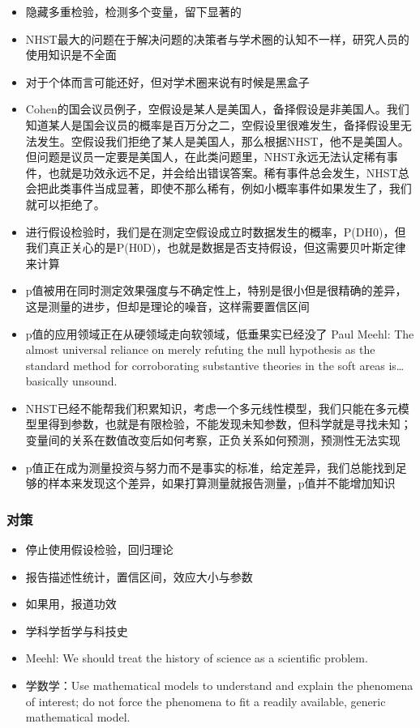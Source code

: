 \documentclass[]{book}
\providecommand{\tightlist}{%
  \setlength{\itemsep}{0pt}\setlength{\parskip}{0pt}}
\begin{document}
\begin{itemize}
\tightlist
\item
  隐藏多重检验，检测多个变量，留下显著的
\item
  NHST最大的问题在于解决问题的决策者与学术圈的认知不一样，研究人员的使用知识是不全面
\item
  对于个体而言可能还好，但对学术圈来说有时候是黑盒子
\item
  Cohen的国会议员例子，空假设是某人是美国人，备择假设是非美国人。我们知道某人是国会议员的概率是百万分之二，空假设里很难发生，备择假设里无法发生。空假设我们拒绝了某人是美国人，那么根据NHST，他不是美国人。但问题是议员一定要是美国人，在此类问题里，NHST永远无法认定稀有事件，也就是功效永远不足，并会给出错误答案。稀有事件总会发生，NHST总会把此类事件当成显著，即使不那么稀有，例如小概率事件如果发生了，我们就可以拒绝了。
\item
  进行假设检验时，我们是在测定空假设成立时数据发生的概率，P(D\textbar{}H0)，但我们真正关心的是P(H0\textbar{}D)，也就是数据是否支持假设，但这需要贝叶斯定律来计算
\item
  p值被用在同时测定效果强度与不确定性上，特别是很小但是很精确的差异，这是测量的进步，但却是理论的噪音，这样需要置信区间
\item
  p值的应用领域正在从硬领域走向软领域，低垂果实已经没了 Paul Meehl: The
  almost universal reliance on merely refuting the null hypothesis as
  the standard method for corroborating substantive theories in the soft
  areas is\ldots{} basically unsound.
\item
  NHST已经不能帮我们积累知识，考虑一个多元线性模型，我们只能在多元模型里得到参数，也就是有限检验，不能发现未知参数，但科学就是寻找未知；变量间的关系在数值改变后如何考察，正负关系如何预测，预测性无法实现
\item
  p值正在成为测量投资与努力而不是事实的标准，给定差异，我们总能找到足够的样本来发现这个差异，如果打算测量就报告测量，p值并不能增加知识
\end{itemize}

\subsubsection{对策}

\begin{itemize}
\tightlist
\item
  停止使用假设检验，回归理论
\item
  报告描述性统计，置信区间，效应大小与参数
\item
  如果用，报道功效
\item
  学科学哲学与科技史
\item
  Meehl: We should treat the history of science as a scientific problem.
\item
  学数学：Use mathematical models to understand and explain the
  phenomena of interest; do not force the phenomena to fit a readily
  available, generic mathematical model.
\end{itemize}
\end{document}
